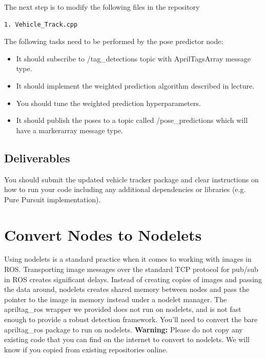 \documentclass[letta4 paper]{article}
\begin{document}
The next step is to modify the following files in the repository

\begin{lstlisting}[language=bash]
  1. Vehicle_Track.cpp
\end{lstlisting}
The following tasks need to be performed by the pose predictor node: 
\begin{itemize}
    \item It should subscribe to /tag\_detections topic with AprilTagsArray message type.
    \item It should implement the weighted prediction algorithm described in lecture. 
    \item You should tune the weighted prediction hyperparameters.
    \item It should publish the poses to a topic called /pose\_predictions which will have a markerarray message type. 
\end{itemize}{}

\subsection{Deliverables}
You should submit the updated vehicle tracker package and clear instructions on how to run your code including any additional dependencies or libraries (e.g. Pure Pursuit implementation).

\clearpage
\section{Convert Nodes to Nodelets}
Using nodelets is a standard practice when it comes to working with images in ROS. Transporting image messages over the standard TCP protocol for pub/sub in ROS creates significant delays. Instead of creating copies of images and passing the data around, nodelets creates shared memory between nodes and pass the pointer to the image in memory instead under a nodelet manager.
The apriltag\_ros wrapper we provided does not run on nodelets, and is not fast enough to provide a robust detection framework. You'll need to convert the bare apriltag\_ros package to run on nodelets.
\textbf{Warning:} Please do not copy any existing code that you can find on the internet to convert to nodelets. We will know if you copied from existing repositories online.\\
 
\end{document}
